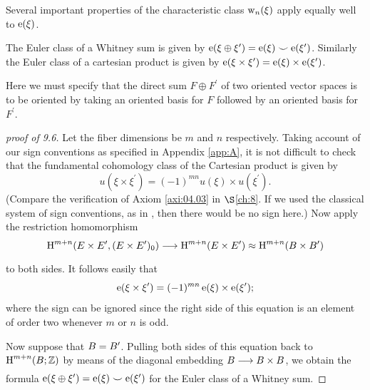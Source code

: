 \documentclass[../main]{subfiles}
\begin{document}
Several important properties of the characteristic class $\operatorname{w}_{n}(\xi)$ apply equally well to $\operatorname{e}(\xi)$. 

\begin{property}\label{pro:09.06}
 The Euler class of a Whitney sum is given by \newline
 $\operatorname{e}(\xi \oplus \xi^{\prime})=\operatorname{e}(\xi) \smile \operatorname{e}(\xi^{\prime})$. Similarly the Euler class of a cartesian product is given by $\operatorname{e}(\xi \times \xi^{\prime})=\operatorname{e}(\xi) \times \operatorname{e}(\xi^{\prime})$.
\end{property} 

Here we must specify that the direct sum $F \oplus F^{\prime}$ of two oriented vector spaces is to be oriented by taking an oriented basis for $F$ followed by an oriented basis for $F^{\prime}$.

\begin{proof}[proof of 9.6]
Let the fiber dimensions be $m$ and $n$ respectively. Taking account of our sign conventions as specified in Appendix \ref{app:A}, it is not difficult to check that the fundamental cohomology class of the Cartesian product is given by
\[
u(\xi \times \xi^{\prime})=(-1)^{mn} u(\xi) \times u(\xi^{\prime}) .
\]
(Compare the verification of Axiom \ref{axi:04.03} in $\S$\ref{ch:8}. If we used the classical system of sign conventions, as in \cite{spanier1981}, then there would be no sign here.) Now apply the restriction homomorphism
\[
\homology^{m+n}(\total \times \total^{\prime},(\total \times \total^{\prime})_{0}) \varrightarrow{} \homology^{m+n}(\total \times \total^{\prime}) \approx \homology^{m+n}(\base \times \base^{\prime})
\]
to both sides. It follows easily that
\[
\operatorname{e}(\xi \times \xi^{\prime})=(-1)^{mn} \operatorname{e}(\xi) \times \operatorname{e}(\xi^{\prime}) ;
\]
where the sign can be ignored since the right side of this equation is an element of order two whenever $m$ or $n$ is odd.

Now suppose that $B=B^{\prime}$. Pulling both sides of this equation back to $\operatorname{H}^{m+n}(B ; \mathbb{Z})$ by means of the diagonal embedding $\base \varrightarrow{} \base \times \base$, we obtain the formula $\operatorname{e}(\xi \oplus \xi^{\prime})=\operatorname{e}(\xi) \smile \operatorname{e}(\xi^{\prime})$ for the Euler class of a Whitney sum.
\end{proof} 
\end{document}

